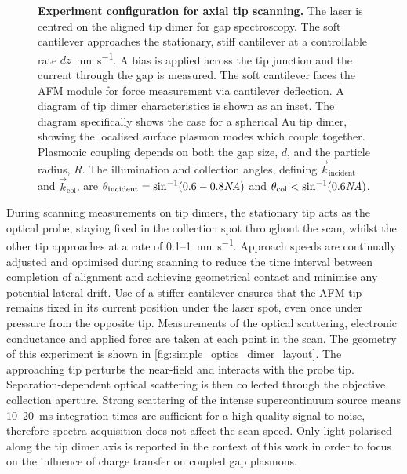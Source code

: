 \documentclass[a4paper]{article}
\begin{document}
\begin{figure}[bt]
\vspace{-10pt}
\centering
\fontsize{10pt}{1em}\selectfont
{}
\caption[Experiment configuration for axial tip scanning]{\textbf{Experiment configuration for axial tip scanning.} The laser is centred on the aligned tip dimer for gap spectroscopy. The soft cantilever approaches the stationary, stiff cantilever at a controllable rate $dz$~\si{\nano\metre\per\second}. A bias is applied across the tip junction and the current through the gap is measured. The soft cantilever faces the AFM module for force measurement via cantilever deflection.
A diagram of tip dimer characteristics is shown as an inset. The diagram specifically shows the case for a spherical Au tip dimer, showing the localised surface plasmon modes which couple together. Plasmonic coupling depends on both the gap size, $d$, and the particle radius, $R$. The illumination and collection angles, defining $\vec{k}_{\mathrm{incident}}$ and $\vec{k}_{\mathrm{col}}$, are $\theta_{\mathrm{incident}} = \sin^{-1}(0.6-0.8\mathit{NA})$ and $\theta_{\mathrm{col}} < \sin^{-1}(0.6\mathit{NA})$.
}
\label{fig:simple_optics_dimer_layout}
\vspace{-5pt}
\end{figure}

During scanning measurements on tip dimers, the stationary tip acts as the optical probe, staying fixed in the collection spot throughout the scan, whilst the other tip approaches at a rate of 0.1--\SI{1}{\nano\metre\per\second}. Approach speeds are continually adjusted and optimised during scanning to reduce the time interval between completion of alignment and achieving geometrical contact and minimise any potential lateral drift. Use of a stiffer cantilever ensures that the AFM tip remains fixed in its current position under the laser spot, even once under pressure from the opposite tip. Measurements of the optical scattering, electronic conductance and applied force are taken at each point in the scan. The geometry of this experiment is shown in \autoref{fig:simple_optics_dimer_layout}.
The approaching tip perturbs the near-field and interacts with the probe tip. Separation-dependent optical scattering is then collected through the objective collection aperture. Strong scattering of the intense supercontinuum source means 10--\SI{20}{ms} integration times are sufficient for a high quality signal to noise, therefore spectra acquisition does not affect the scan speed. %
Only light polarised along the tip dimer axis is reported in the context of this work in order to focus on the influence of charge transfer on coupled gap plasmons. %
\end{document}
